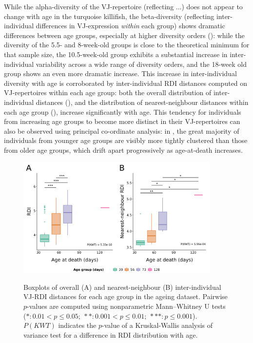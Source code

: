 While the alpha-diversity of the VJ-repertoire (reflecting ...)  does not appear to change with age in the turquoise killifish, the beta-diversity (reflecting inter-individual differences in VJ-expression \textit{within} each group) shows dramatic differences between age groups, especially at higher diversity orders (): while the diversity of the 5.5- and 8-week-old groups is close to the theoretical minimum for that sample size, the 10.5-week-old group exhibits a substantial increase in inter-individual variability across a wide range of diversity orders, and the 18-week old group shows an even more dramatic increase. This increase in inter-individual diversity with age is corroborated by inter-individual RDI distances computed on VJ-repertoires within each age group: both the overall distribution of inter-individual distances (), and the distribution of nearest-neighbour distances within each age group (), increase significantly with age. This tendency for individuals from increasing age groups to become more distinct in their VJ-repertoires can also be observed using principal co-ordinate analysis:  in , the great majority of individuals from younger age groups are visibly more tightly clustered than those from older age groups, which drift apart progressively as age-at-death increases.

\begin{figure}
\centering
\includegraphics[width = 0.9\textwidth]{_Figures/png/ageing-rdi-VJ-individual-groupdist}
\begin{subfigure}{0em}
\label{fig:igseq-ageing-rdi-VJ-individual-groupdist-all}
\end{subfigure}
\begin{subfigure}{0em}
\label{fig:igseq-ageing-rdi-VJ-individual-groupdist-nn}
\end{subfigure}
\caption{Boxplots of overall (A) and nearest-neighbour (B) inter-individual VJ-RDI distances for each age group in the \igseq ageing dataset. Pairwise $p$-values are computed using nonparametric Mann–Whitney U tests ($*: 0.01 < p \leq 0.05;~**: 0.001 < p \leq 0.01;~***: p \leq 0.001$). $P(KWT)$ indicates the $p$-value of a Kruskal-Wallis analysis of variance test for a difference in RDI distribution with age.}
\label{fig:igseq-ageing-rdi-VJ-individual-groupdist}
\end{figure}

